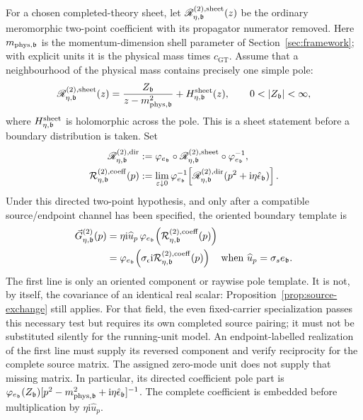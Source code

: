 \documentclass[final,5p,times,twocolumn,numbers,nopreprintline]{elsarticle}
\numberwithin{equation}{section}
\theoremstyle{definition}
\theoremstyle{remark}
\newcommand{\ii}{\mathrm i}
\newcommand{\bb}{\mathfrak b}
\newcommand{\cGT}{c_{\mathrm{GT}}}
\newcommand{\ee}{e_{\bb}}
\newcommand{\epsvec}{\hat\epsilon_{\bb}}
\newcommand{\embed}{\varphi_{\ee}}
\begin{document}
For a chosen completed-theory sheet, let
\(\mathscr R^{(2),\rm sheet}_{\eta,\bb}(z)\) be the
ordinary meromorphic two-point coefficient with its propagator
numerator removed. Here \(m_{{\rm phys},\bb}\) is the
momentum-dimension shell parameter of Section~\ref{sec:framework};
with explicit units it is the physical mass times \(\cGT\). Assume that a neighbourhood of the physical
mass contains precisely one simple pole:
\begin{equation}
 \mathscr R^{(2),\rm sheet}_{\eta,\bb}(z)
  =\frac{Z_{\bb}}{z-m_{\rm phys,\bb}^2}
            +H^{\rm sheet}_{\eta,\bb}(z),
 \qquad 0<|Z_{\bb}|<\infty,
 \label{eq:full-pole}
\end{equation}
where \(H^{\rm sheet}_{\eta,\bb}\) is holomorphic across the
pole. This is a sheet statement before a boundary distribution
is taken. Set
\begin{align}
 \mathscr R^{(2),\rm dir}_{\eta,\bb}
   &:=\embed\circ
          \mathscr R^{(2),\rm sheet}_{\eta,\bb}
                   \circ\embed^{-1},\nonumber\\
 \mathcal R^{(2),\rm coeff}_{\eta,\bb}(p)
   &:=\lim_{\varepsilon\downarrow0}
       \embed^{-1}\!\left[
       \mathscr R^{(2),\rm dir}_{\eta,\bb}
              (p^2+\ii\eta\epsvec)\right].
 \label{eq:LSZ-explicit-coefficient-extraction}
\end{align}
Under this directed two-point hypothesis, and only after a compatible
source/endpoint channel has been specified, the oriented boundary
template is
\begin{align}
 \vec G^{(2)}_{\eta,\bb}(p)
 &=\eta\ii\widehat u_p\,
       \embed\!\left(
           \mathcal R^{(2),\rm coeff}_{\eta,\bb}(p)\right)
       \nonumber\\
 &=\embed\!\left(\sigma_\epsilon\ii
           \mathcal R^{(2),\rm coeff}_{\eta,\bb}(p)\right)
       \quad\text{when }\widehat u_p=\sigma_s\ee.
 \label{eq:LSZ-physical-directed-kernel}
\end{align}
The first line is only an oriented component or raywise pole template.
It is not, by itself, the covariance of an identical real scalar:
Proposition~\ref{prop:source-exchange} still applies. For that field,
the even fixed-carrier specialization passes this necessary test but
requires its own completed source pairing; it must not be substituted
silently for the running-unit model. An endpoint-labelled realization of the
first line must supply its reversed component and verify reciprocity
for the complete source matrix. The assigned zero-mode unit does not
supply that missing matrix.
In particular, its directed coefficient pole part is
\(\embed(Z_{\bb})[p^2-m_{\rm phys,\bb}^2
+\ii\eta\epsvec]^{-1}\). The complete coefficient is
embedded before multiplication by \(\eta\ii\widehat u_p\).
\end{document}
